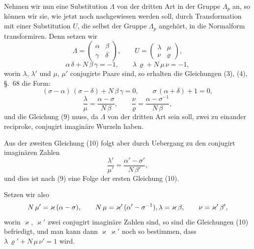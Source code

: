 \documentclass[12pt,a4paper]{article}
\begin{document}
Nehmen wir nun eine Substitution $\varLambda$ von der dritten Art in der Gruppe $\varLambda_{p}$ an, so können wir sie, wie jetzt noch nachgewiesen werden soll, durch Transformation mit einer Substitution $U$, die selbst der Gruppe $\varLambda_{p}$ angehört, in die Normalform transformiren. Denn setzen wir
\begin{equation}\label{eq:69.7}
\tag{7}
\varLambda = \begin{pmatrix}\alpha&\beta\\\gamma&\delta\end{pmatrix},\qquad
U = \begin{pmatrix}\lambda&\mu\\\nu&\varrho\end{pmatrix},
\end{equation}
\begin{equation}\label{eq:69.8}
\tag{8}
\alpha\,\delta + N\,\beta\,\gamma = -1,\qquad
\lambda\,\varrho + N\,\mu\,\nu = -1,
\end{equation}
worin $\lambda$, $\lambda'$ und $\mu$, $\mu'$ conjugirte Paare sind, so erhalten die Gleichungen (3), (4), \S.~68 die Form:
\begin{equation}\label{eq:69.9}
\tag{9}
(\sigma - \alpha)\,(\sigma - \delta) + N\,\beta\,\gamma = 0,\qquad
\sigma\,(\alpha + \delta) + 1 = 0,
\end{equation}
\begin{equation}\label{eq:69.10}
\tag{10}
\frac{\lambda}{\mu} = \frac{\alpha - \sigma}{N\,\beta},\qquad
\frac{\nu}{\varrho} = \frac{\alpha - \sigma^{-1}}{N\,\beta},
\end{equation}
und die Gleichung (9) muss, da $\varLambda$ von der dritten Art sein soll, zwei zu einander reciproke, conjugirt imaginäre Wurzeln haben.

Aus der zweiten Gleichung (10) folgt aber durch Uebergang zu den conjugirt imaginären Zahlen
\[
\frac{\lambda'}{\mu'} = \frac{\alpha' - \sigma'}{N\,\beta'},
\]
und dies ist nach (9) eine Folge der ersten Gleichung (10).

Setzen wir also
\[
N\,\mu' = \varkappa\,(\alpha - \sigma),\qquad
N\,\mu = \varkappa'\,(\alpha' - \sigma^{-1}),\\
\lambda = \varkappa\,\beta,\qquad \nu = \varkappa'\,\beta',
\]
worin $\varkappa$, $\varkappa'$ zwei conjugirt imaginäre Zahlen sind, so sind die Gleichungen (10) befriedigt, und man kann dann $\varkappa\,\varkappa'$ noch so bestimmen, dass $\lambda\,\varrho' + N\,\mu\,\nu' = 1$ wird.
\end{document}
